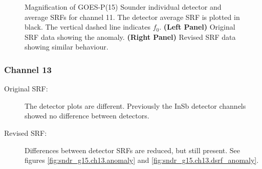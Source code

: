 \begin{figure}[htp]
\begin{tabular}{c c}
  \end{tabular}
  \caption{Magnification of GOES-P(15) Sounder individual detector and average SRFs for channel 11. The detector average SRF is plotted in black. The vertical dashed line indicates $f_0$. \textbf{(Left Panel)} Original SRF data showing the anomaly. \textbf{(Right Panel)} Revised SRF data showing similar behaviour.}
  \label{fig:sndr_g15.ch11.anomaly}
\end{figure}

\subsubsection{Channel 13}
\begin{description}
  \item[Original SRF:] The detector plots are different. Previously the InSb detector channels showed no difference between detectors.
  \item[Revised SRF:]  Differences between detector SRFs are reduced, but still present. See figures \ref{fig:sndr_g15.ch13.anomaly} and \ref{fig:sndr_g15.ch13.dsrf_anomaly}.
\end{description}

